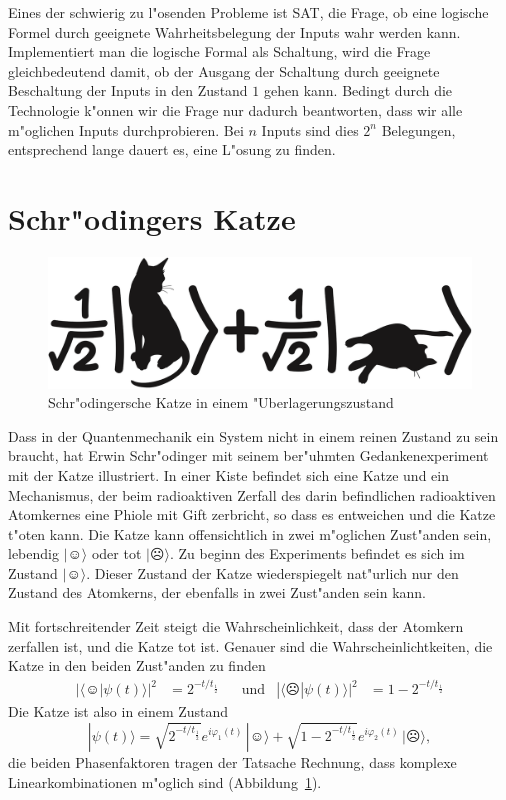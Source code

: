 Eines der schwierig zu l"osenden Probleme ist SAT, die Frage, ob eine
logische Formel durch geeignete Wahrheitsbelegung der Inputs wahr
werden kann. Implementiert man die logische Formal als Schaltung,
wird die Frage gleichbedeutend damit, ob der Ausgang der Schaltung
durch geeignete Beschaltung der Inputs in den Zustand $1$  gehen kann.
Bedingt durch die Technologie k"onnen wir die Frage nur dadurch beantworten,
dass wir alle m"oglichen Inputs durchprobieren. Bei $n$ Inputs sind
dies $2^n$ Belegungen, entsprechend lange dauert es, eine L"osung
zu finden.

\section{Schr"odingers Katze\label{section:cat}}
\begin{figure}
\centering
\includegraphics[width=0.5\hsize]{images/catliveanddead2.png}
\caption{Schr"odingersche Katze in einem "Uberlagerungszustand
\label{skript:deadandalive}}
\end{figure}
Dass in der Quantenmechanik ein System nicht in einem reinen Zustand
zu sein braucht, hat Erwin Schr"odinger mit seinem ber"uhmten 
Gedankenexperiment mit der Katze illustriert.
In einer Kiste befindet sich eine Katze und ein Mechanismus,
der beim radioaktiven Zerfall des darin befindlichen radioaktiven
Atomkernes eine Phiole mit Gift zerbricht, so dass es entweichen und
die Katze t"oten kann.
Die Katze kann offensichtlich in zwei m"oglichen Zust"anden sein,
lebendig $|\smiley\rangle$ oder tot $|\frownie\rangle$. 
Zu beginn des Experiments befindet es sich im Zustand $|\smiley\rangle$.
Dieser Zustand der Katze wiederspiegelt nat"urlich nur den Zustand
des Atomkerns, der ebenfalls in zwei Zust"anden sein kann.

Mit fortschreitender Zeit steigt die Wahrscheinlichkeit, dass der
Atomkern zerfallen ist, und die Katze tot ist.
Genauer sind die Wahrscheinlichtkeiten, die Katze in den beiden
Zust"anden zu finden
\begin{align*}
|\langle \smiley|\psi(t)\rangle|^2
&=
2^{-t/t_{\frac12}}
&&\text{und}
&
|\langle \frownie|\psi(t)\rangle|^2
&=
1-2^{-t/t_{\frac12}}
\end{align*}
Die Katze ist also in einem Zustand
\[
|\psi(t)\rangle = 
\sqrt{2^{-t/t_{\frac12}}}e^{i\varphi_1(t)}\,|\smiley\rangle
+
\sqrt{1-2^{-t/t_{\frac12}}}e^{i\varphi_2(t)}\,|\frownie\rangle,
\]
die beiden Phasenfaktoren tragen der Tatsache Rechnung, dass komplexe
Linearkombinationen m"oglich sind (Abbildung~\ref{skript:deadandalive}).

